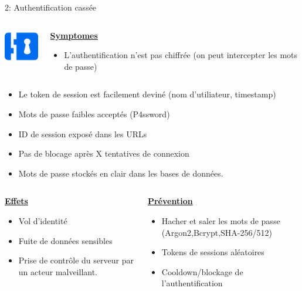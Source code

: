\documentclass[final,hyperref={pdfpagelabels=false}]{beamer}
\begin{document}
\begin{frame}[t]
\begin{columns}[t]
\begin{column}{.465\textwidth}
\begin{block}{2: Authentification cassée}

	\begin{columns}[T]

		\begin{column}{.125\textwidth} %
			\includegraphics[scale=2.3]{rimlock.png}
		\end{column}

		\begin{column}{.875\textwidth}
			\uline{\uline{\textbf{Symptomes}}}
			\begin{itemize}
				\item L'authentification n'est pas chiffrée (on peut intercepter les mots de passe)
			\end{itemize}
		\end{column}
	\end{columns}
	\begin{itemize}
		\item Le token de session est facilement deviné (nom d'utiliateur, timestamp)
		\item Mots de passe faibles acceptés (P4ssword)
		\item ID de session exposé dans les URLs
		\item Pas de blocage après X tentatives de connexion
		\item Mots de passe stockés en clair dans les bases de données.
	\end{itemize}
	\begin{columns}[T]
		\begin{column}{0.5\textwidth}
			\vfill
			\uline{\textbf{Effets}}
			\begin{itemize}
				\item Vol d'identité
				\item Fuite de données sensibles
				\item Prise de contrôle du serveur par un acteur malveillant.
			\end{itemize}
			\vfill
		\end{column}
		\begin{column}{0.5\textwidth}
			\vfill
			\uline{\textbf{Prévention}}
			\begin{itemize}
				\item Hacher et saler les mots de passe (Argon2,Bcrypt,SHA-256/512)
				\item Tokens de sessions aléatoires
				\item Cooldown/blockage de l'authentification
			\end{itemize}
		\end{column}
	\end{columns}



\end{block}
\end{column}
\end{columns}
\end{frame}
\end{document}
